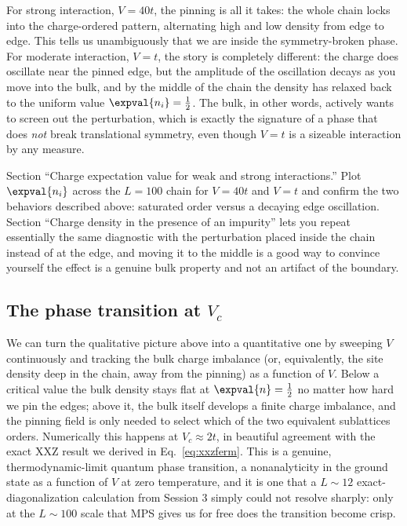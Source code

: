 \documentclass[all_sessions.tex]{subfiles}
\begin{document}
For strong interaction, $V=40t$, the pinning is all it takes: the whole chain locks into the
charge-ordered pattern, alternating high and low density from edge to edge. This tells us
unambiguously that we are inside the symmetry-broken phase. For moderate interaction, $V=t$, the
story is completely different: the charge does oscillate near the pinned edge, but the amplitude of
the oscillation decays as you move into the bulk, and by the middle of the chain the density has
relaxed back to the uniform value $\expval{n_i}=\tfrac12$. The bulk, in other words, actively wants
to screen out the perturbation, which is exactly the signature of a phase that does \emph{not} break
translational symmetry, even though $V=t$ is a sizeable interaction by any measure.

\begin{notebook}
Section ``Charge expectation value for weak and strong interactions.'' Plot $\expval{n_i}$ across
the $L=100$ chain for $V=40t$ and $V=t$ and confirm the two behaviors described above: saturated
order versus a decaying edge oscillation. Section ``Charge density in the presence of an impurity''
lets you repeat essentially the same diagnostic with the perturbation placed inside the chain
instead of at the edge, and moving it to the middle is a good way to convince yourself the effect is
a genuine bulk property and not an artifact of the boundary.
\end{notebook}

\subsection{The phase transition at $V_c$}
We can turn the qualitative picture above into a quantitative one by sweeping $V$ continuously and
tracking the bulk charge imbalance (or, equivalently, the site density deep in the chain, away from
the pinning) as a function of $V$. Below a critical value the bulk density stays flat at
$\expval{n}=\tfrac12$ no matter how hard we pin the edges; above it, the bulk itself develops a
finite charge imbalance, and the pinning field is only needed to select which of the two equivalent
sublattices orders. Numerically this happens at $V_c\approx 2t$, in beautiful agreement with the
exact XXZ result we derived in Eq.~\eqref{eq:xxzferm}. This is a genuine, thermodynamic-limit quantum
phase transition, a nonanalyticity in the ground state as a function of $V$ at zero temperature, and
it is one that a $L\sim 12$ exact-diagonalization calculation from Session 3 simply could not resolve
sharply: only at the $L\sim100$ scale that MPS gives us for free does the transition become crisp.
\end{document}
